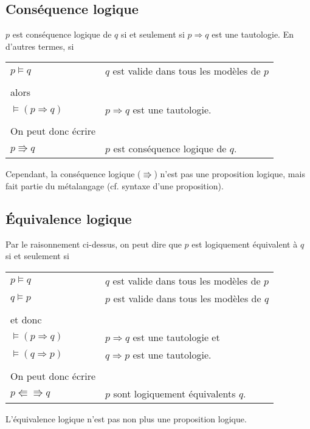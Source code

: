 		\subsection{Conséquence logique}
			$p$ est conséquence logique de $q$ si et seulement si $p \Rightarrow q$ est une tautologie. En d'autres termes, si
			\begin{center}
			\begin{tabular}{ll}
			$p \models q$ & $q$ est valide dans tous les modèles de $p$ \\
			&\\
			alors & \\
			$\models (p \Rightarrow q)$ & $p \Rightarrow q$ est une tautologie.\\
			&\\
			On peut donc écrire & \\
			$p \Rrightarrow q$ & $p$ est conséquence logique de $q$.\\
			\end{tabular}
			\end{center}
			Cependant, la conséquence logique ($\Rrightarrow$) n'est pas une proposition logique, mais fait partie du métalangage (cf. syntaxe d'une proposition).
		
		\subsection{Équivalence logique}
			Par le raisonnement ci-dessus, on peut dire que $p$ est logiquement équivalent à $q$ si et seulement si
			\begin{center}
			\begin{tabular}{ll}
			$p \models q$ & $q$ est valide dans tous les modèles de $p$ \\
			$q \models p$ & $p$ est valide dans tous les modèles de $q$ \\
			&\\
			et donc & \\
			$\models (p \Rightarrow q)$ & $p \Rightarrow q$ est une tautologie et\\
			$\models (q \Rightarrow p)$ & $q \Rightarrow p$ est une tautologie.\\
			&\\
			On peut donc écrire & \\
			$p \Lleftarrow \Rrightarrow q$ & $p$ sont logiquement équivalents $q$.\\ 
			\end{tabular}
			\end{center}
			L'équivalence logique n'est pas non plus une proposition logique.\\
			
